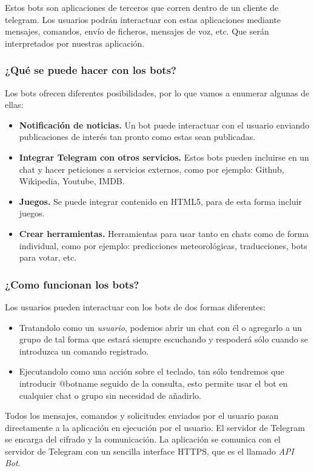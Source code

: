 \documentclass[10pt,journal,compsoc]{IEEEtran}
\begin{document}
Estos bots son aplicaciones de terceros que corren dentro de un cliente de 
telegram. Los usuarios podrán interactuar con estas aplicaciones mediante 
mensajes, comandos, envío de ficheros, mensajes de voz, etc. Que serán 
interpretados por nuestras aplicación.

\subsubsection{¿Qué se puede hacer con los bots?}
Los bots ofrecen diferentes posibilidades, por lo que vamos a enumerar algunas 
de ellas:
\begin{itemize}
  \item \textbf{Notificación de noticias.} Un bot puede interactuar con el 
  usuario enviando publicaciones de interés tan pronto como estas sean 
  publicadas.
  \item \textbf{Integrar Telegram con otros servicios.} Estos bots pueden 
  incluirse en un chat y hacer peticiones a servicios externos, como por 
  ejemplo: Github, Wikipedia, Youtube, IMDB.
  \item \textbf{Juegos.} Se puede integrar contenido en HTML5, para de esta 
  forma incluir juegos.
  \item \textbf{Crear herramientas.} Herramientas para usar tanto en chats como 
  de forma individual, como por ejemplo: predicciones meteorológicas, 
  traducciones, bots para votar, etc.
\end{itemize}

\subsubsection{¿Como funcionan los bots?}
Los usuarios pueden interactuar con los bots de dos formas diferentes:
\begin{itemize}
  \item Tratandolo como un \textit{usuario}, podemos abrir un chat con él o agregarlo a un grupo de tal
  forma que estará siempre escuchando y respoderá sólo cuando se introduzca un comando registrado.
  \item Ejecutandolo como una acción sobre el teclado, tan sólo tendremos que 
  introducir @botname seguido de la consulta, esto permite usar el bot en 
  cualquier chat o grupo sin necesidad de añadirlo.
\end{itemize}

Todos los mensajes, comandos y solicitudes enviados por el usuario pasan 
directamente a la aplicación en ejecución por el usuario. El servidor de 
Telegram se encarga del cifrado y la comunicación. La aplicación se comunica con 
el servidor de Telegram con un sencilla interface HTTPS, que es el llamado \textit{API 
Bot}.
\end{document}
